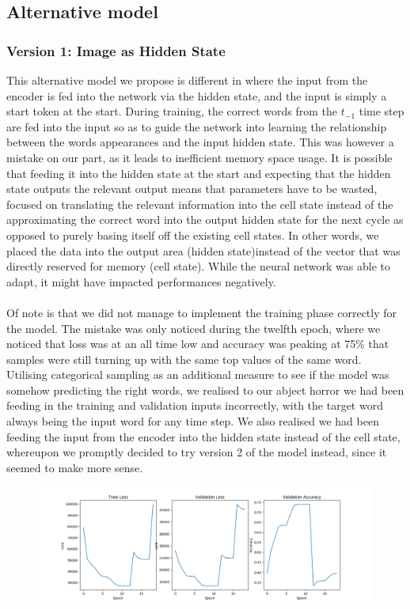 \documentclass{proc}
\begin{document}
\subsection{Alternative model}
\subsubsection{Version 1: Image as Hidden State}
This alternative model we propose is different in where the input from the encoder is fed into the network via the hidden state, and the input is simply a start token at the start. During training, the correct words from the $t_{-1}$ time step are fed into the input so as to guide the network into learning the relationship between the words appearances and the input hidden state. This was however a mistake on our part, as it leads to inefficient memory space usage. It is possible that feeding it into the hidden state at the start and expecting that the hidden state outputs the relevant output means that parameters have to be wasted, focused on translating the relevant information into the cell state instead of the approximating the correct word into the output hidden state for the next cycle as opposed to purely basing itself off the existing cell states. In other words, we placed the data into the output area (hidden state)instead of the vector that was directly reserved for memory (cell state). While the neural network was able to adapt, it might have impacted performances negatively.
\paragraph{} Of note is that we did not manage to implement the training phase correctly for the model. The mistake was only noticed during the twelfth epoch, where we noticed that loss was at an all time low and accuracy was peaking at 75\% that samples were still turning up with the same top values of the same word. Utilising categorical sampling as an additional measure to see if the model was somehow predicting the right words, we realised to our abject horror we had been feeding in the training and validation inputs incorrectly, with the target word always being the input word for any time step. We also realised we had been feeding the input from the encoder into the hidden state instead of the cell state, whereupon we promptly decided to try version 2 of the model instead, since it seemed to make more sense.
\begin{figure}[h!]
  \includegraphics[width=\linewidth]{image_as_hidden.png}
\end{figure}
\end{document}
